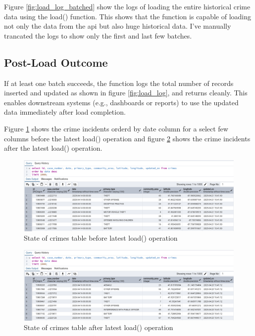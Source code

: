 \documentclass[12pt]{article}
\begin{document}
Figure \ref{fig:load_log_batched} show the logs of loading the entire historical crime data using the load() function. This shows that the function is capable of loading not only the data from the api but also huge historical data. I've manually trancated the logs to show only the first and last few batches.

\subsection*{Post-Load Outcome}
If at least one batch succeeds, the function logs the total number of records inserted and updated as shown in figure \ref{fig:load_log}, and returns cleanly. This enables downstream systems (e.g., dashboards or reports) to use the updated data immediately after load completion.

Figure \ref{fig:db_before_load} shows the crime incidents orderd by date column for a select few columns before the latest load() operation and figure \ref{fig:db_after_load} shows the crime incidents after the latest load() operation.

\begin{figure}[h!]
    \centering
    \includegraphics[width=1\textwidth]{figures/db_before_load.png}
    \caption{State of crimes table before latest load() operation}
    \label{fig:db_before_load}
\end{figure}

\begin{figure}[h!]
    \centering
    \includegraphics[width=1\textwidth]{figures/db_after_load.png}
    \caption{State of crimes table after latest load() operation}
    \label{fig:db_after_load}
\end{figure}
\end{document}
